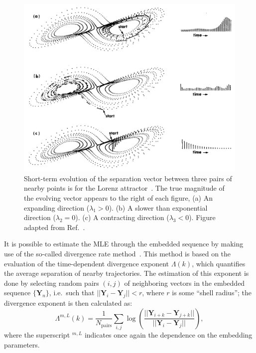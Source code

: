 \begin{figure}[!htbp]
\centering
\includegraphics[width=\linewidth]{images/lorenz_lyapunov.png}   
\caption{
    Short-term evolution of the separation vector between three pairs of
    nearby points is for the Lorenz attractor~\cite{lorenz1963deterministic}.
    The true magnitude of the evolving
    vector appears to the right of each figure, (a) An expanding direction ($\lambda_1>0$). (b)
    A slower than exponential direction ($\lambda_2=0$). (c) A contracting direction ($\lambda_3<0$).
    Figure adapted from Ref.~\cite{wolf1986quantifying}.
}\label{fig: lorenz lyapunov}
\end{figure}

It is possible to estimate the MLE through the embedded sequence by making use of the so-called
divergence rate method~\cite{ref:gao1993local}. This method
is based on the evaluation of the time-dependent divergence exponent $\Lambda(k)$,
which quantifies the average separation of nearby trajectories.
The estimation of this exponent is done by selecting random pairs $(i,j)$ of neighboring vectors
in the embedded sequence $\{\mathbf{Y}_n\}$, i.e.\ such that $||\mathbf{Y}_i-\mathbf{Y}_j||<r$,
where $r$ is some ``shell radius''; the divergence exponent is then calculated as:
\begin{equation}
    \label{eq: divergence exponent}
    \Lambda^{m,L}(k)=\frac{1}{N_{\text{pairs}}}\sum_{i,j}\log\left(
        \frac{||\mathbf{Y}_{i+k}-\mathbf{Y}_{j+k}||}{||\mathbf{Y}_i-\mathbf{Y}_j||}
    \right),
\end{equation}
where the superscript $^{m,L}$ indicates once again the dependence on the embedding parameters.

